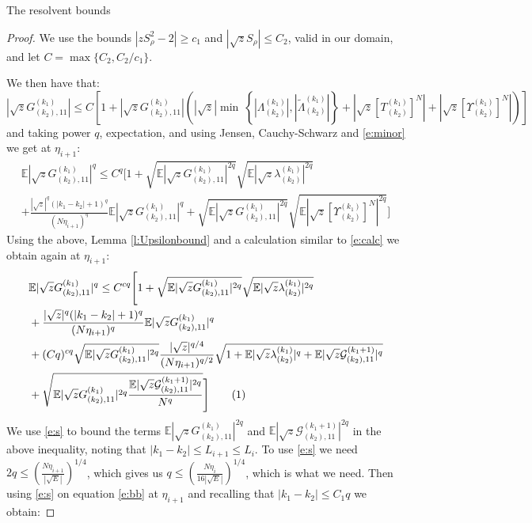 \documentclass[11pt, a4paper, oneside]{book}
\numberwithin{equation}{chapter}
\newcommand{\E}{\mathbb E}
\newcommand\numberthis{\addtocounter{equation}{1}\tag{\theequation}}
\begin{document}
\begin{section}{The resolvent bounds}
\begin{proof}
We use the bounds $|{z} S_{\rho}^2 - 2|\geq c_1$ and $|\sqrt{z} S_{\rho}| \leq C_2$, valid in our domain, and let $C = \max \{ C_2 , C_2 / c_1 \}  .$

We then have that:
%
\begin{equation*}
|\sqrt{z}G^{(k_1)}_{(k_2),11}|
\leq C \left [ 1+ \left |\sqrt{z} G^{(k_1)}_{(k_2),11} \right | \left (|\sqrt{z}| \min\ \left \{|\Lambda^{(k_1)}_{(k_2)}|, |\tilde\Lambda^{(k_1)}_{(k_2)}| \right \} + \left |\sqrt{z}[T^{(k_1)}_{(k_2)}]^N \right |+ \left |\sqrt{z}[\Upsilon^{(k_1)}_{(k_2)}]^N \right | \right ) \right ]
\end{equation*}
%
and taking power $q$, expectation, and using Jensen, Cauchy-Schwarz and \eqref{e:minor} we get at $\eta_{i+1}$:
%
\begin{multline} \label{3.5}
\mathbb{E}|\sqrt{z}G^{( k_1)}_{( k_2), 11}|^q
\leq C^q \Bigg [ 1+ \sqrt{\mathbb{E}|\sqrt{z}G^{( k_1)}_{( k_2), 11}|^{2q}} \sqrt{\mathbb{E}|\sqrt{z}\lambda^{( k_1)}_{( k_2)}|^{2q}}
\\
+ \frac{|\sqrt{z}|^q (|k_1-k_2|+1)^q}{(N\eta_{i+1})^q} \mathbb{E}|\sqrt{z}G^{( k_1)}_{( k_2), 11}|^{q} +\sqrt{\mathbb{E}|\sqrt{z}G^{( k_1)}_{( k_2), 11}|^{2q}} \sqrt{\mathbb{E}|\sqrt{z}[\Upsilon^{( k_1 )}_{( k_2)}]^N|^{2q}} \Bigg ]
\end{multline}
%
Using the above, Lemma \ref{l:Upsilonbound} and a calculation similar to \eqref{e:calc} we obtain again at $\eta_{i+1}$:
%
\begin{align*}\label{e:bootstrap}
 &\mathbb{E}|\sqrt{z}G^{(k_1)}_{(k_2), 11}|^q \leq C^{cq} \Bigg [ 1+ \sqrt{\mathbb{E}|\sqrt{z}G^{( k_1)}_{( k_2), 11}|^{2q}} \sqrt{\mathbb{E}|\sqrt{z}\lambda^{( k_1)}_{( k_2)}|^{2q}} \\
 &+
  \frac{|\sqrt{z}|^q (|k_1-k_2|+1)^q}{(N\eta_{i+1})^q} \mathbb{E}|\sqrt{z}G^{( k_1)}_{( k_2), 11}|^{q} \\
  &+ (Cq)^{cq} \sqrt{\mathbb{E}|\sqrt{z}G^{( k_1)}_{( k_2), 11}|^{2q}} \frac{|\sqrt{z}|^{q/4}}{(N\eta_{i+1})^{q/2}} \sqrt{1 + \E |\sqrt z \lambda^{(k_1)}_{(k_2)}| ^{q} +  \E|\sqrt z \mathcal{G}^{(k_1+1)}_{(k_2), 11}|^{q}} \\
  &+  \sqrt{\E|\sqrt{z}G^{(k_1)}_{(k_2), 11}|^{2q}\frac{\E|\sqrt{z} \mathcal{G}^{(k_1+1)}_{(k_2), 11}|^{2q}}{N^q}} \Bigg ] \numberthis
\end{align*}
%
We use \eqref{e:s} to bound the terms $\mathbb{E}|\sqrt{z}G^{(k_1)}_{(k_2), 11}|^{2q}$ and $\E| \sqrt{z} \mathcal{G}^{(k_1+1)}_{(k_2), 11}|^{2q}$ in the above inequality, noting that $|k_1 - k_2| \leq L_{i+1} \leq L_i$. To use \eqref{e:s} we need $2q \leq  \left (\frac{N \eta_{i+1}}{|\sqrt{E}|} \right )^{1/4}$, which gives us $q \leq \left(\frac{N \eta_i}{16|\sqrt{E}|} \right )^{1/4} $, which is what we need. Then using \eqref{e:s} on equation \eqref{e:bb} at $\eta_{i+1}$ and recalling that $|k_1-k_2| \leq C_1q$ we obtain:

\end{proof}
\end{section}
\end{document}
